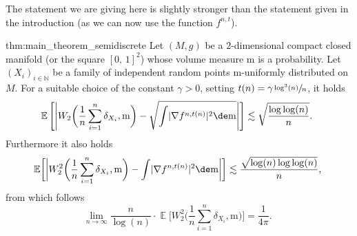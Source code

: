\documentclass[JEP,XML,SOM,Unicode]{cedram}
\theoremstyle{plain}
\theoremstyle{definition}
\numberwithin{equation}{section}
\newcommand{\NN}{\ensuremath{\mathbb N}}
\newcommand{\E}[1]{\ensuremath{\operatorname{\mathbb{E}}\left[#1\right]}}
\newcommand{\bbE}[1]{\ensuremath{\operatorname{\mathbb{E}}\biggl[#1\biggr]}}
\newcommand{\cc}[2]{\ensuremath{\left[#1,\,#2\right]}}
\renewcommand{\comma}{\ensuremath{\text{, }}}
\newcommand{\comma}{\ensuremath{\text{, }}}
\newcommand{\fullstop}{\ensuremath{\text{. }}}
\newcommand{\m}{\ensuremath{\mathrm m}}
\newcommand{\metric}{\ensuremath{g}}
\DeclarePairedDelimiter\abs{\lvert}{\rvert}
\begin{document}
The statement we are giving here is slightly stronger than the statement given in the introduction (as we
can now use the function $f^{n,t}$).
\begin{reptheorem}{thm:main_theorem_semidiscrete}
Let $(M,\metric)$ be a $2$-dimensional compact closed manifold (or the square $\cc01^2$) whose volume
measure $\m$ is a probability.
Let $(X_i)_{i\in\NN}$ be a family of independent random points $\m$-uniformly distributed on $M$.
For a suitable choice of the constant $\gamma>0$, setting $t(n) = \gamma\sfrac{\log^3(n)}{n}$, it holds
\begin{equation*}
\E{\abs*{W_2\biggl(\frac1n\sum_{i=1}^n\delta_{X_i}, \m\biggr)
- \sqrt{\int \abs{\nabla f^{n,t(n)}}^2\de\m}}}
\lesssim \sqrt{\frac{\log\log(n)}n} \fullstop
\end{equation*}
Furthermore it also holds
\begin{equation*}
\bbE{\biggl|W^2_2\biggl(\frac1n\sum_{i=1}^n\delta_{X_i}, \m\biggr) - \int \abs{\nabla f^{n,t(n)}}^2\de\m\biggr|}
\lesssim \frac{\sqrt{\log(n)\log\log(n)}}n \comma
\end{equation*}
from which follows
\begin{equation*}
\lim_{n\to\infty} \frac{n}{\log(n)}\cdot\bbE{W^2_2\biggl(\frac1n\sum_{i=1}^n\delta_{X_i}, \m\biggr)}
=\frac1{4\pi} \fullstop
\end{equation*}
\end{reptheorem}
\end{document}
